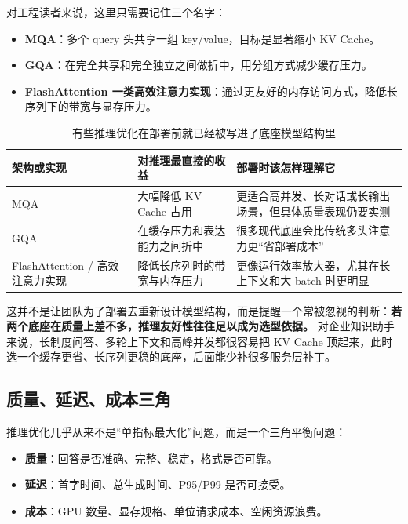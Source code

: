 对工程读者来说，这里只需要记住三个名字：
\begin{itemize}
  \item \textbf{MQA}：多个 query 头共享一组 key/value，目标是显著缩小 KV Cache。
  \item \textbf{GQA}：在完全共享和完全独立之间做折中，用分组方式减少缓存压力。
  \item \textbf{FlashAttention 一类高效注意力实现}：通过更友好的内存访问方式，降低长序列下的带宽与显存压力。
\end{itemize}

\begin{table}[H]
\centering
\small
\begin{tabularx}{\textwidth}{>{\raggedright\arraybackslash}p{2.8cm}>{\raggedright\arraybackslash}p{3.2cm}>{\raggedright\arraybackslash}X}
\toprule
\textbf{架构或实现} & \textbf{对推理最直接的收益} & \textbf{部署时该怎样理解它} \\
\midrule
MQA & 大幅降低 KV Cache 占用 & 更适合高并发、长对话或长输出场景，但具体质量表现仍要实测 \\
GQA & 在缓存压力和表达能力之间折中 & 很多现代底座会比传统多头注意力更“省部署成本” \\
FlashAttention / 高效注意力实现 & 降低长序列时的带宽与内存压力 & 更像运行效率放大器，尤其在长上下文和大 batch 时更明显 \\
\bottomrule
\end{tabularx}
\caption{有些推理优化在部署前就已经被写进了底座模型结构里}
\label{tab:inference-arch-friendly}
\end{table}

这并不是让团队为了部署去重新设计模型结构，而是提醒一个常被忽视的判断：\textbf{若两个底座在质量上差不多，推理友好性往往足以成为选型依据。} 对企业知识助手来说，长制度问答、多轮上下文和高峰并发都很容易把 KV Cache 顶起来，此时选一个缓存更省、长序列更稳的底座，后面能少补很多服务层补丁。

\subsection{质量、延迟、成本三角}
推理优化几乎从来不是“单指标最大化”问题，而是一个三角平衡问题：
\begin{itemize}
  \item \textbf{质量}：回答是否准确、完整、稳定，格式是否可靠。
  \item \textbf{延迟}：首字时间、总生成时间、P95/P99 是否可接受。
  \item \textbf{成本}：GPU 数量、显存规格、单位请求成本、空闲资源浪费。
\end{itemize}

